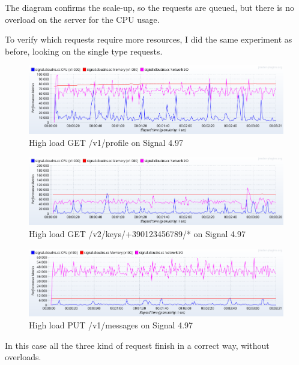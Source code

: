 The diagram confirms the scale-up, so the requests are queued, but there is no overload on the server for the CPU usage.

To verify which requests require more resources, I did the same experiment as before, looking on the single type requests.


\begin{figure}[H]
    \centering
    \includegraphics[width=\textwidth]{images/497/message-load-1}
    \caption{High load GET /v1/profile on Signal 4.97}
    \label{fig:signalload1oldmessage}
\end{figure}


\begin{figure}[H]
    \centering
    \includegraphics[width=\textwidth]{images/497/message-load-2}
    \caption{High load GET /v2/keys/+390123456789/* on Signal 4.97}
    \label{fig:signalload2oldmessage}
\end{figure}


\begin{figure}[H]
    \centering
    \includegraphics[width=\textwidth]{images/497/message-load-3}
    \caption{High load PUT /v1/messages on Signal 4.97}
    \label{fig:signalload3oldmessage}
\end{figure}

In this case all the three kind of request finish in a correct way, without overloads.


